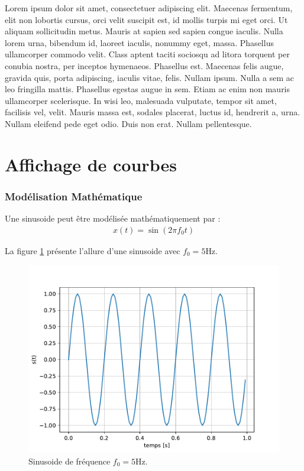 Lorem ipsum dolor sit amet, consectetuer adipiscing elit. Maecenas fermentum, elit non lobortis cursus, orci velit suscipit est, id mollis turpis mi eget orci. Ut aliquam sollicitudin metus. Mauris at sapien sed sapien congue iaculis. Nulla lorem urna, bibendum id, laoreet iaculis, nonummy eget, massa. Phasellus ullamcorper commodo velit. Class aptent taciti sociosqu ad litora torquent per conubia nostra, per inceptos hymenaeos. Phasellus est. Maecenas felis augue, gravida quis, porta adipiscing, iaculis vitae, felis. Nullam ipsum. Nulla a sem ac leo fringilla mattis. Phasellus egestas augue in sem. Etiam ac enim non mauris ullamcorper scelerisque. In wisi leo, malesuada vulputate, tempor sit amet, facilisis vel, velit. Mauris massa est, sodales placerat, luctus id, hendrerit a, urna. Nullam eleifend pede eget odio. Duis non erat. Nullam pellentesque.

\section{Affichage de courbes}

\subsubsection{Modélisation Mathématique}

Une sinusoide peut être modélisée mathématiquement par :
\begin{align}
x(t) = \sin(2\pi f_0 t)
\end{align}

La figure \ref{fig:mafigure3} présente l'allure d'une sinusoide avec $f_0=5$Hz.

\begin{figure}[h]
   \begin{center}
      \includegraphics[width=0.6\linewidth]{chapter2/figures/sinewave.pdf}
   \end{center}
   \caption{Sinusoide de fréquence $f_0=5$Hz.}
   \label{fig:mafigure3}
\end{figure}

